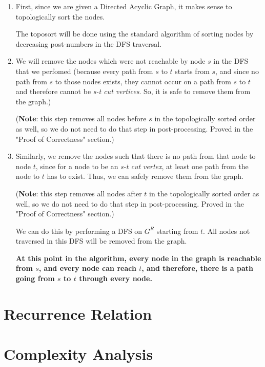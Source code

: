 \documentclass{article}
\begin{document}
\begin{enumerate}
    \item First, since we are given a Directed Acyclic Graph, it makes sense to topologically sort the nodes. 

    The toposort will be done using the standard algorithm of sorting nodes by decreasing post-numbers in the DFS traversal.

    \item We will remove the nodes which were not reachable by node $s$ in the DFS that we perfomed (because every path from $s$ to $t$ starts from $s$, and since no path from $s$ to those nodes exists, they cannot occur on a path from $s$ to $t$ and therefore cannot be \emph{s-t cut vertices}. So, it is safe to remove them from the graph.) 

    (\textbf{Note}: this step removes all nodes before $s$ in the topologically sorted order as well, so we do not need to do that step in post-processing. Proved in the "Proof of Correctness" section.)

    \item Similarly, we remove the nodes such that there is no path from that node to node $t$, since for a node to be an \emph{s-t cut vertex}, at least one path from the node to $t$ has to exist. Thus, we can safely remove them from the graph. 

    (\textbf{Note}: this step removes all nodes after $t$ in the topologically sorted order as well, so we do not need to do that step in post-processing. Proved in the "Proof of Correctness" section.)

    We can do this by performing a DFS on $G^R$ starting from $t$. All nodes not traversed in this DFS will be removed from the graph.

    \textbf{At this point in the algorithm, every node in the graph is reachable from $s$, and every node can reach $t$, and therefore, there is a path going from $s$ to $t$ through every node.}
\end{enumerate}

\section{Recurrence Relation}

\section{Complexity Analysis}
\end{document}
